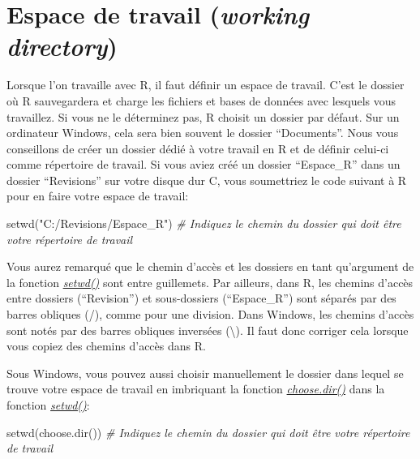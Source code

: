 \documentclass[
]{book}
\newenvironment{Shaded}{\begin{snugshade}}{\end{snugshade}}
\newcommand{\CommentTok}[1]{\textcolor[rgb]{0.56,0.35,0.01}{\textit{#1}}}
\newcommand{\FunctionTok}[1]{\textcolor[rgb]{0.00,0.00,0.00}{#1}}
\newcommand{\NormalTok}[1]{#1}
\newcommand{\StringTok}[1]{\textcolor[rgb]{0.31,0.60,0.02}{#1}}
\begin{document}
\hypertarget{working_directory}{%
\section{\texorpdfstring{Espace de travail (\emph{working directory})}{Espace de travail (working directory)}}\label{working_directory}}

Lorsque l'on travaille avec R, il faut définir un espace de travail. C'est le dossier où R sauvegardera et charge les fichiers et bases de données avec lesquels vous travaillez. Si vous ne le déterminez pas, R choisit un dossier par défaut. Sur un ordinateur Windows, cela sera bien souvent le dossier ``Documents''. Nous vous conseillons de créer un dossier dédié à votre travail en R et de définir celui-ci comme répertoire de travail. Si vous aviez créé un dossier ``Espace\_R'' dans un dossier ``Revisions'' sur votre disque dur C, vous soumettriez le code suivant à R pour en faire votre espace de travail:

\begin{Shaded}
\begin{Highlighting}[]
\FunctionTok{setwd}\NormalTok{(}\StringTok{"C:/Revisions/Espace\_R"}\NormalTok{) }\CommentTok{\# Indiquez le chemin du dossier qui doit être votre répertoire de travail}
\end{Highlighting}
\end{Shaded}

Vous aurez remarqué que le chemin d'accès et les dossiers en tant qu'argument de la fonction \href{https://www.rdocumentation.org/packages/base/versions/3.6.2/topics/getwd}{\emph{setwd()}} sont entre guillemets. Par ailleurs, dans R, les chemins d'accès entre dossiers (``Revision'') et sous-dossiers (``Espace\_R'') sont séparés par des barres obliques (/), comme pour une division. Dans Windows, les chemins d'accès sont notés par des barres obliques inversées (\textbackslash). Il faut donc corriger cela lorsque vous copiez des chemins d'accès dans R.

Sous Windows, vous pouvez aussi choisir manuellement le dossier dans lequel se trouve votre espace de travail en imbriquant la fonction \href{https://www.rdocumentation.org/packages/utils/versions/3.6.2/topics/choose.dir}{\emph{choose.dir()}} dans la fonction \href{https://www.rdocumentation.org/packages/base/versions/3.6.2/topics/getwd}{\emph{setwd()}}:

\begin{Shaded}
\begin{Highlighting}[]
\FunctionTok{setwd}\NormalTok{(}\FunctionTok{choose.dir}\NormalTok{()) }\CommentTok{\# Indiquez le chemin du dossier qui doit être votre répertoire de travail}
\end{Highlighting}
\end{Shaded}
\end{document}
